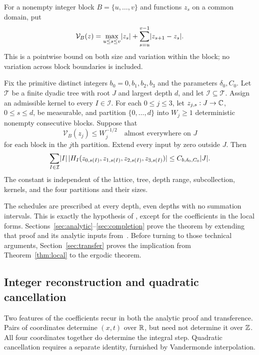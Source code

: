 For a nonempty integer block $B=\{u,\ldots,v\}$ and functions $z_s$ on
a common domain, put
\[
 \mathcal V_B(z)=\max_{u\le s\le v}\lvert z_s\rvert
       +\sum_{s=u}^{v-1}\lvert z_{s+1}-z_s\rvert.
\]
This is a pointwise bound on both size and variation within the block;
no variation across block boundaries is included.

\begin{theorem}\label{thm:local}
Fix the primitive distinct integers $b_0=0,b_1,b_2,b_3$ and the
parameters $\delta_0,C_0$. Let $\mathcal T$ be a finite dyadic tree with root
$J$ and largest depth $d$, and let $\mathcal I\subseteq\mathcal T$.
Assign an admissible kernel to every $I\in\mathcal I$.
For each $0\le j\le3$, let $z_{j,s}:J\to\mathbb C$, $0\le s\le d$, be
measurable, and partition $\{0,\ldots,d\}$ into $W_j\ge1$
deterministic nonempty consecutive blocks. Suppose that
\[
 \mathcal V_B(z_j)\le W_j^{-1/2}\quad\text{almost everywhere on }J
\]
for each block in the $j$th partition. Extend every input by zero
outside $J$. Then
\begin{equation}\label{eq:local-estimate}
 \sum_{I\in\mathcal I}\lvert I\rvert\,
 \lvert H_I(z_{0,s(I)},z_{1,s(I)},z_{2,s(I)},z_{3,s(I)})\rvert
 \le C_{b,\delta_0,C_0}\lvert J\rvert.
\end{equation}
The constant is independent of the lattice, tree, depth range,
subcollection, kernels, and the four partitions and their sizes.
\end{theorem}

The schedules are prescribed at every depth, even depths with no
summation intervals. This is exactly the hypothesis of
\cite[Theorem~3.2]{V}, except for the coefficients in the local forms.
Sections~\ref{sec:analytic}--\ref{sec:completion} prove the theorem by
extending that proof and its analytic inputs from~\cite{H}. Before
turning to those technical arguments, Section~\ref{sec:transfer} proves
the implication from Theorem~\ref{thm:local} to the ergodic theorem.

\subsection{Integer reconstruction and quadratic cancellation}
Two features of the coefficients recur in both the analytic proof and
transference. Pairs of coordinates determine $(x,t)$ over $\mathbb R$, but
need not determine it over $\mathbb Z$. All four coordinates together do
determine the integral step. Quadratic cancellation requires a separate
identity, furnished by Vandermonde interpolation.

